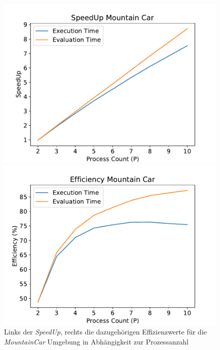 \begin{figure}[!h]
	\centering
	\begin{minipage}[]{0.49\textwidth}
		\includegraphics[width=1.0\textwidth]{./img/mountain_car_analysis/mountain_car_speedup_2_10.pdf} 
	\end{minipage}
	\hfill
	\begin{minipage}[]{0.49\textwidth}
		\includegraphics[width=1.0\textwidth]{./img/mountain_car_analysis/efficecny mountain_car_2_10.pdf} 
	\end{minipage}
	\caption{Links der \emph{SpeedUp}, rechts die dazugehörigen Effizienzwerte für die \emph{MountainCar} Umgebung in Abhängigkeit zur Prozessanzahl}
	\label{fig:mountain_car_2_10_efficiency_speedup}
\end{figure}
